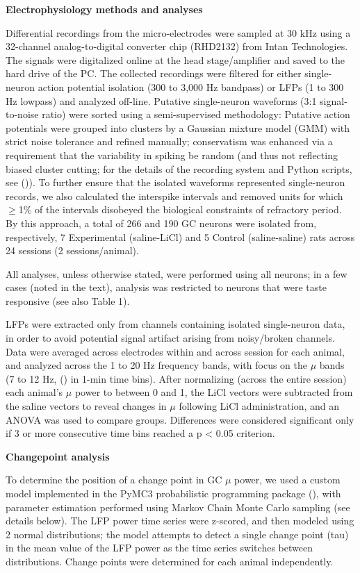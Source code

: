\begin{refsection}
\smallskip
\noindent\textbf{Electrophysiology methods and analyses}\par
\noindent 
Differential recordings from the micro-electrodes were sampled at 30 kHz using a 32-channel analog-to-digital converter chip (RHD2132) from Intan Technologies. The signals were digitalized online at the head stage/amplifier and saved to the hard drive of the PC. The collected recordings were filtered for either single-neuron action potential isolation (300 to 3,000 Hz bandpass) or LFPs (1 to 300 Hz lowpass) and analyzed off-line. Putative single-neuron waveforms (3:1 signal-to-noise ratio) were sorted using a semi-supervised methodology: Putative action potentials were grouped into clusters by a Gaussian mixture model (GMM) with strict noise tolerance and refined manually; conservatism was enhanced via a requirement that the variability in spiking be random (and thus not reflecting biased cluster cutting; for the details of the recording system and Python scripts, see (\cite{mukherjee2017a})). To further ensure that the isolated waveforms represented single-neuron records, we also calculated the interspike intervals and removed units for which \(\ge\)1\% of the intervals disobeyed the biological constraints of refractory period. By this approach, a total of 266 and 190 GC neurons were isolated from, respectively, 7 Experimental (saline-LiCl) and 5 Control (saline-saline) rats across 24 sessions (2 sessions/animal).

All analyses, unless otherwise stated, were performed using all neurons; in a few cases (noted in the text), analysis was restricted to neurons that were taste responsive (see also Table 1).

LFPs were extracted only from channels containing isolated single-neuron data, in order to avoid potential signal artifact arising from noisy/broken channels. Data were averaged across electrodes within and across session for each animal, and analyzed across the 1 to 20 Hz frequency bands, with focus on the \(\mu\) bands (7 to 12 Hz, (\cite{tort2010a,tort2010b,thomson1991a}) in 1-min time bins). After normalizing (across the entire session) each animal’s \(\mu\) power to between 0 and 1, the LiCl vectors were subtracted from the saline vectors to reveal changes in \(\mu\) following LiCl administration, and an ANOVA was used to compare groups. Differences were considered significant only if 3 or more consecutive time bins reached a p < 0.05 criterion.

\smallskip
\noindent\textbf{Changepoint analysis}\par
\noindent 
To determine the position of a change point in GC \(\mu\) power, we used a custom model implemented in the PyMC3 probabilistic programming package (\cite{salvatier2016a}), with parameter estimation performed using Markov Chain Monte Carlo sampling (see details below). The LFP power time series were z-scored, and then modeled using 2 normal distributions; the model attempts to detect a single change point (tau) in the mean value of the LFP power as the time series switches between distributions. Change points were determined for each animal independently.


\end{refsection}
